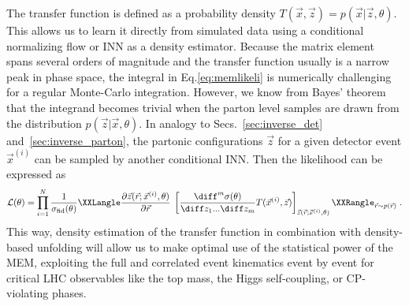 \documentclass[submission,Phys]{SciPost}
\begin{document}
The transfer function is defined as a probability density $T(\vec{x},\vec{z}) = p(\vec{x}|\vec{z},\theta)$. This allows us to learn it directly from simulated data using a conditional normalizing flow or INN as a density estimator. Because the matrix element spans several orders of magnitude and the transfer function usually is a narrow peak in phase space, the integral in Eq.\eqref{eq:memlikeli} is numerically challenging for a regular Monte-Carlo integration. However, we know from Bayes' theorem that the integrand becomes trivial when the parton level samples are drawn from the distribution $p(\vec{z} | \vec{x}, \theta)$. In analogy to Secs.~\ref{sec:inverse_det} and~\ref{sec:inverse_parton}, the partonic configurations $\vec{z}$ for a given detector event $\vec{x}^{(i)}$ can be sampled by another conditional INN. Then the likelihood can be expressed as
%
\begin{align}
  \mathcal{L(\theta)} = \prod\limits_{i=1}^N \frac{1}{\sigma_\text{fid}(\theta)}
  \XXLangle
  \frac{\partial \vec{z}(\vec{r}; \vec{x}^{(i)},\theta)}{\partial \vec{r}} \; 
  \left[ \frac{\diff^m\sigma(\theta)}{\diff z_1...\diff z_m} T(\vec{x}^{(i)},\vec{z}) \right]_{\vec{z}(\vec{r}; \vec{x}^{(i)},\theta)}
  \XXRangle_{\vec{r} \sim p(\vec{r})} \; .
\end{align}
%
This way, density estimation of the transfer function in combination with density-based unfolding will allow us to make optimal use of the statistical power of the MEM, exploiting the full and correlated event kinematics event by event for critical LHC observables like the top mass, the Higgs self-coupling, or CP-violating phases.
\end{document}
